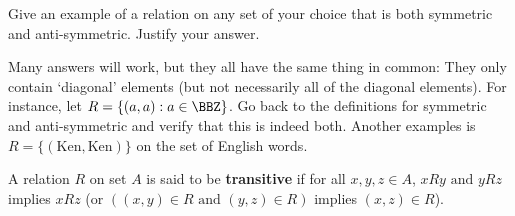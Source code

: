 \begin{exer}
Give an example of a relation on any set of your choice that is both symmetric and
anti-symmetric.  Justify your answer.

\noindent
\answerlinetwo
\begin{answer}
Many answers will work, but they all have the same thing in common: They only contain
`diagonal' elements (but not necessarily all of the diagonal elements).
For instance, let $R=\{(a,a): a\in \BBZ\}$.
Go back to the definitions for symmetric and anti-symmetric and verify that this is indeed both.
Another examples is $R=\{(\mbox{Ken}, \mbox{Ken})\}$ on the set of English words.
\end{answer}
\end{exer}



\begin{df}
A relation $R$ on set $A$ is said to be
{\bf transitive} if
for all $x,y,z\in A$,
$x R y\mbox{ and }  y R z$ implies $x R z$
(or $((x,y)\in R \mbox{ and }  (y,z)\in R)$ implies $(x,z)\in R$).
\end{df}

